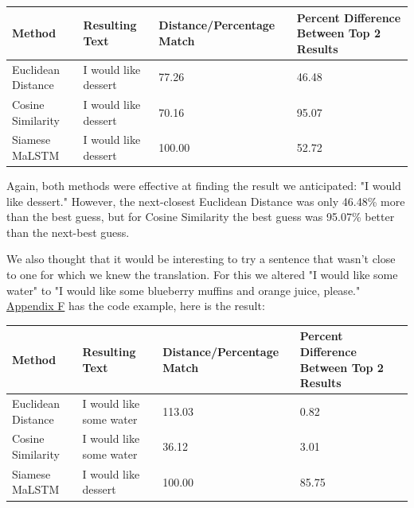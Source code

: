 \documentclass[runningheads]{llncs}
\begin{document}
\vspace{10 mm}
	\begin{minipage}{\linewidth}
		\begin{center}
			\begin{tabular}{| l | l | l | l |}
			  \hline			
			  Method & Resulting Text & Distance/Percentage Match & Percent Difference Between Top 2 Results \\
			  \hline			
			  Euclidean Distance & I would like dessert & 77.26 & 46.48 \\
			  \hline			
			  Cosine Similarity & I would like dessert & 70.16 & 95.07 \\
			  \hline  
			  Siamese MaLSTM & I would like dessert & 100.00 & 52.72 \\
			  \hline
			\end{tabular}
		\end{center}
	\end{minipage}
	\afterpage{\clearpage}
\vspace{10 mm}



	Again, both methods were effective at finding the result we anticipated: "I would like dessert." However, the next-closest Euclidean Distance was only 46.48\% more than the best guess, but for Cosine Similarity the best guess was 95.07\% better than the next-best guess. 

	We also thought that it would be interesting to try a sentence that wasn't close to one for which we knew the translation. For this we altered "I would like some water" to "I would like some blueberry muffins and orange juice, please."  \hyperlink{Appendix F}{Appendix F} has the code example, here is the result:



\vspace{10 mm}
	\begin{minipage}{\linewidth}
		\begin{center}
			\begin{tabular}{| l | l | l | l |}
			  \hline			
			  Method & Resulting Text & Distance/Percentage Match & Percent Difference Between Top 2 Results \\
			  \hline			
			  Euclidean Distance & I would like some water & 113.03 & 0.82 \\
			  \hline			
			  Cosine Similarity & I would like some water & 36.12 & 3.01 \\
			  \hline  
			  Siamese MaLSTM & I would like dessert & 100.00 & 85.75 \\
			  \hline
			\end{tabular}
		\end{center}
	\end{minipage}
	\afterpage{\clearpage}
\vspace{10 mm}
\end{document}
